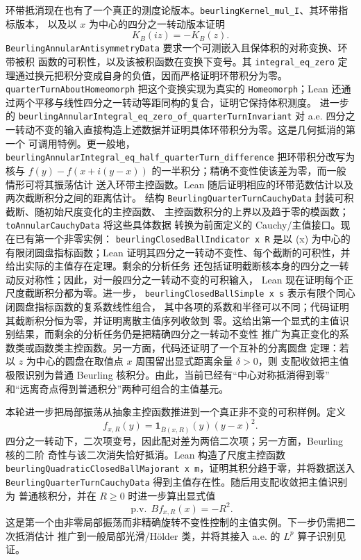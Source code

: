 \documentclass[UTF8,fontset=none,a4paper,11pt]{ctexart}
\begin{document}
环带抵消现在也有了一个真正的测度论版本。\texttt{beurlingKernel\_mul\_I}、其环带指标版本，
以及以 \(x\) 为中心的四分之一转动版本证明
\[
 K_B(iz)=-K_B(z).
\]
\texttt{BeurlingAnnularAntisymmetryData} 要求一个可测嵌入且保体积的对称变换、环带被积
函数的可积性，以及该被积函数在变换下变号。其
\texttt{integral\_eq\_zero} 定理通过换元把积分变成自身的负值，因而严格证明环带积分为零。
\texttt{quarterTurnAboutHomeomorph} 把这个变换实现为真实的 \texttt{Homeomorph}；Lean
还通过两个平移与线性四分之一转动等距同构的复合，证明它保持体积测度。
进一步的 \texttt{beurlingAnnularIntegral\_eq\_zero\_of\_quarterTurnInvariant} 对 a.e.
四分之一转动不变的输入直接构造上述数据并证明具体环带积分为零。这是几何抵消的第一个
可调用特例。更一般地，\texttt{beurlingAnnularIntegral\_eq\_half\_quarterTurn\_difference}
把环带积分改写为核与
\(f(y)-f(x+i(y-x))\) 的一半积分；精确不变性使该差为零，而一般情形可将其振荡估计
送入环带主控函数。Lean 随后证明相应的环带范数估计以及两次截断积分之间的距离估计。
结构 \texttt{BeurlingQuarterTurnCauchyData} 封装可积截断、随初始尺度变化的主控函数、
主控函数积分的上界以及趋于零的模函数；\texttt{toAnnularCauchyData} 将这些具体数据
转换为前面定义的 Cauchy/主值接口。现在已有第一个非零实例：
\texttt{beurlingClosedBallIndicator x R} 是以 (x) 为中心的有限闭圆盘指标函数；Lean
证明其四分之一转动不变性、每个截断的可积性，并给出实际的主值存在定理。剩余的分析任务
还包括证明截断核本身的四分之一转动反对称性；因此，对一般四分之一转动不变的可积输入，
Lean 现在证明每个正尺度截断积分都为零。进一步，
\texttt{beurlingClosedBallSimple x s} 表示有限个同心闭圆盘指标函数的复系数线性组合，
其中各项的系数和半径可以不同；代码证明其截断积分恒为零，并证明离散主值序列收敛到
零。这给出第一个显式的主值识别结果，而剩余的分析任务仍是把精确四分之一转动不变性
推广为真正变化的系数类或函数类主控函数。另一方面，代码还证明了一个互补的分离圆盘
定理：若以 \(z\) 为中心的圆盘在取值点 \(x\) 周围留出显式距离余量 \(\delta>0\)，则
支配收敛把主值极限识别为普通 Beurling 核积分。由此，当前已经有“中心对称抵消得到零”
和“远离奇点得到普通积分”两种可组合的主值基元。\par
本轮进一步把局部振荡从抽象主控函数推进到一个真正非不变的可积样例。定义
\[
 f_{x,R}(y)=\mathbf 1_{\overline B(x,R)}(y)(y-x)^2.
\]
四分之一转动下，二次项变号，因此配对差为两倍二次项；另一方面，Beurling 核的二阶
奇性与该二次消失恰好抵消。Lean 构造了尺度主控函数
\texttt{beurlingQuadraticClosedBallMajorant x m}，证明其积分趋于零，并将数据送入
\texttt{BeurlingQuarterTurnCauchyData} 得到主值存在性。随后用支配收敛把主值识别为
普通核积分，并在 \(R\ge0\) 时进一步算出显式值
\[
 \operatorname{p.v.}\,Bf_{x,R}(x)=-R^2.
\]
这是第一个由非零局部振荡而非精确旋转不变性控制的主值实例。下一步仍需把二次抵消估计
推广到一般局部光滑/Hölder 类，并将其接入 a.e. 的 \(L^p\) 算子识别见证。\par
\end{document}
